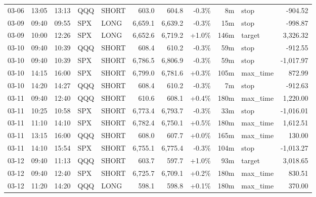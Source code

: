 \documentclass[11pt,a4paper,twoside]{article}
\begin{document}
\begin{center}
\begin{longtable}{>{\color{txtmain}}l l l l l r r r r >{\color{txtmain}}l r}
03-06 & 13:05 & 13:13 & QQQ & SHORT & 603.0 & 604.8 & \textcolor{lossred}{-0.3\%} & 8m & stop & \textcolor{lossred}{-904.52} \\
03-09 & 09:40 & 09:55 & SPX & LONG & 6,659.1 & 6,639.2 & \textcolor{lossred}{-0.3\%} & 15m & stop & \textcolor{lossred}{-998.87} \\
03-09 & 10:00 & 12:26 & SPX & LONG & 6,652.6 & 6,719.2 & \textcolor{wingreen}{+1.0\%} & 146m & target & \textcolor{wingreen}{3,326.32} \\
03-10 & 09:40 & 10:39 & QQQ & SHORT & 608.4 & 610.2 & \textcolor{lossred}{-0.3\%} & 59m & stop & \textcolor{lossred}{-912.55} \\
03-10 & 09:40 & 10:39 & SPX & SHORT & 6,786.5 & 6,806.9 & \textcolor{lossred}{-0.3\%} & 59m & stop & \textcolor{lossred}{-1,017.97} \\
03-10 & 14:15 & 16:00 & SPX & SHORT & 6,799.0 & 6,781.6 & \textcolor{wingreen}{+0.3\%} & 105m & max\_time & \textcolor{wingreen}{872.99} \\
03-10 & 14:20 & 14:27 & QQQ & SHORT & 608.4 & 610.2 & \textcolor{lossred}{-0.3\%} & 7m & stop & \textcolor{lossred}{-912.63} \\
03-11 & 09:40 & 12:40 & QQQ & SHORT & 610.6 & 608.1 & \textcolor{wingreen}{+0.4\%} & 180m & max\_time & \textcolor{wingreen}{1,220.00} \\
03-11 & 10:25 & 10:58 & SPX & SHORT & 6,773.4 & 6,793.7 & \textcolor{lossred}{-0.3\%} & 33m & stop & \textcolor{lossred}{-1,016.01} \\
03-11 & 11:10 & 14:10 & SPX & SHORT & 6,782.4 & 6,750.1 & \textcolor{wingreen}{+0.5\%} & 180m & max\_time & \textcolor{wingreen}{1,612.51} \\
03-11 & 13:15 & 16:00 & QQQ & SHORT & 608.0 & 607.7 & \textcolor{wingreen}{+0.0\%} & 165m & max\_time & \textcolor{wingreen}{130.00} \\
03-11 & 14:10 & 15:54 & SPX & SHORT & 6,755.1 & 6,775.4 & \textcolor{lossred}{-0.3\%} & 104m & stop & \textcolor{lossred}{-1,013.27} \\
03-12 & 09:40 & 11:13 & QQQ & SHORT & 603.7 & 597.7 & \textcolor{wingreen}{+1.0\%} & 93m & target & \textcolor{wingreen}{3,018.65} \\
03-12 & 09:40 & 12:40 & SPX & SHORT & 6,725.7 & 6,709.1 & \textcolor{wingreen}{+0.2\%} & 180m & max\_time & \textcolor{wingreen}{830.51} \\
03-12 & 11:20 & 14:20 & QQQ & LONG & 598.1 & 598.8 & \textcolor{wingreen}{+0.1\%} & 180m & max\_time & \textcolor{wingreen}{370.00} \\

\end{longtable}
\end{center}
\end{document}
